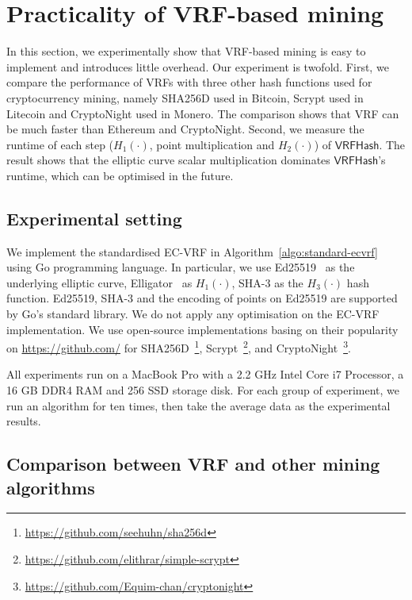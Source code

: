 \section{Practicality of VRF-based mining}
\label{sec:practicality}

In this section, we experimentally show that VRF-based mining is easy to implement and introduces little overhead.
Our experiment is twofold.
First, we compare the performance of VRFs with three other hash functions used for cryptocurrency mining, namely SHA256D used in Bitcoin, Scrypt used in Litecoin and CryptoNight used in Monero.
The comparison shows that VRF can be much faster than Ethereum and CryptoNight.
Second, we measure the runtime of each step ($H_1(\cdot)$, point multiplication and $H_2(\cdot)$) of $\mathsf{VRFHash}$.
The result shows that the elliptic curve scalar multiplication dominates $\mathsf{VRFHash}$'s runtime, which can be optimised in the future.

\subsection{Experimental setting}

We implement the standardised EC-VRF in Algorithm~\ref{algo:standard-ecvrf} using Go programming language.
In particular, we use Ed25519~\cite{bernstein2012high} as the underlying elliptic curve, Elligator~\cite{bernstein2013elligator} as $H_1(\cdot)$, SHA-3 as the $H_3(\cdot)$ hash function.
Ed25519, SHA-3 and the encoding of points on Ed25519 are supported by Go's standard library.
We do not apply any optimisation on the EC-VRF implementation.
We use open-source implementations basing on their popularity on \url{https://github.com/} for SHA256D~\footnote{\url{https://github.com/seehuhn/sha256d}}, Scrypt~\footnote{\url{https://github.com/elithrar/simple-scrypt}}, and CryptoNight~\footnote{\url{https://github.com/Equim-chan/cryptonight}}.

All experiments run on a MacBook Pro with a 2.2 GHz Intel Core i7 Processor, a 16 GB DDR4 RAM and 256 SSD storage disk.
For each group of experiment, we run an algorithm for ten times, then take the average data as the experimental results.




\subsection{Comparison between VRF and other mining algorithms}

